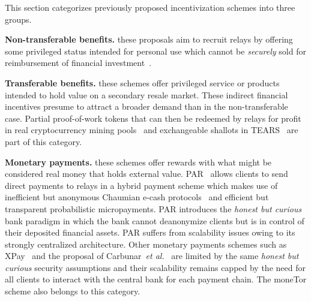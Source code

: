This section categorizes previously proposed incentivization schemes into three groups.

\medskip\noindent\textbf{Non-transferable benefits.} these proposals aim to recruit relays by offering some privileged status intended for personal use which cannot be \emph{securely} sold for reimbursement of financial investment~\cite{dingledine2010building,jansen2010recruiting, jansen2013lira}.

\medskip\noindent\textbf{Transferable benefits.} these schemes offer privileged service or products intended to hold value on a secondary resale market.
These indirect financial incentives presume to attract a broader demand than in the non-transferable case.
Partial proof-of-work tokens that can then be redeemed by relays for profit in real cryptocurrency mining pools~\cite{biryukov2015proof} and exchangeable shallots in TEARS~\cite{jansen2014onions} are part of this category.

\medskip\noindent\textbf{Monetary payments.} these schemes offer rewards with what might be considered real money that holds external value.
PAR~\cite{androulaki2008payment} allows clients to send direct payments to relays in a hybrid payment scheme which makes use of inefficient but anonymous Chaumian e-cash protocols~\cite{chaum1988untraceable} and efficient but transparent probabilistic micropayments.
PAR introduces the \emph{honest but curious} bank paradigm in which the bank cannot deanonymize clients but is in control of their deposited financial assets.
PAR suffers from scalability issues owing to its strongly centralized architecture.
Other monetary payments schemes such as XPay~\cite{chen2009xpay} and the proposal of Carbunar~\textit{et al.}~\cite{carbunar2012tipping} are limited by the same \emph{honest but curious} security assumptions and their scalability remains capped by the need for all clients to interact with the central bank for each payment chain.
The moneTor scheme also belongs to this category.

